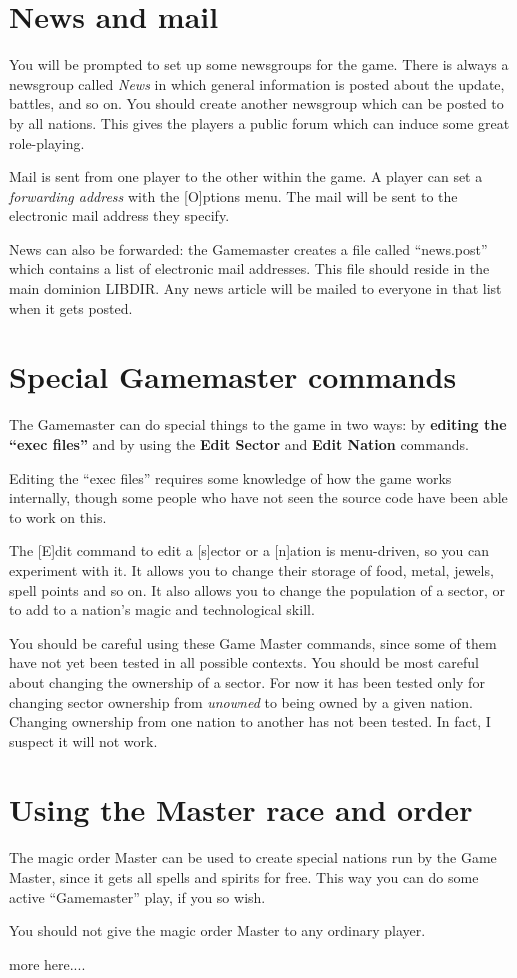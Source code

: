 \chapter{News and mail}

You will be prompted to set up some newsgroups for the game.  There is
always a newsgroup called {\em News} in which general information is
posted about the update, battles, and so on.  You should create
another newsgroup which can be posted to by all nations.  This gives
the players a public forum which can induce some great role-playing.

Mail is sent from one player to the other within the game.  A player
can set a {\em forwarding address} with the [O]ptions menu.  The mail
will be sent to the electronic mail address they specify.

News can also be forwarded: the Gamemaster creates a file called
``news.post'' which contains a list of electronic mail addresses.
This file should reside in the main dominion LIBDIR.  Any news article
will be mailed to everyone in that list when it gets posted.

\chapter{Special Gamemaster commands}

The Gamemaster can do special things to the game in two ways: by {\bf
editing the ``exec files''} and by using the {\bf Edit Sector} and {\bf
Edit Nation} commands.

Editing the ``exec files'' requires some knowledge of how the game
works internally, though some people who have not seen the source code
have been able to work on this.

The [E]dit command to edit a [s]ector or a [n]ation is menu-driven, so
you can experiment with it.  It allows you to change their storage of
food, metal, jewels, spell points and so on.  It also allows you to
change the population of a sector, or to add to a nation's magic and
technological skill.

You should be careful using these Game Master commands, since some of
them have not yet been tested in all possible contexts.  You should be
most careful about changing the ownership of a sector.  For now it has
been tested only for changing sector ownership from {\em unowned} to
being owned by a given nation.  Changing ownership from one nation to
another has not been tested.  In fact, I suspect it will not work.

\chapter{Using the Master race and order}

The magic order Master can be used to create special nations run by
the Game Master, since it gets all spells and spirits for free.  This
way you can do some active ``Gamemaster'' play, if you so wish.

You should not give the magic order Master to any ordinary player.

more here....


